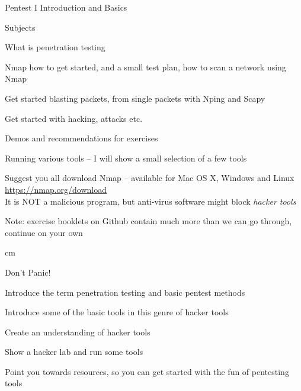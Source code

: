 \documentclass[Screen16to9,17pt]{foils}
\begin{document}
{}

\mytitlepage
{Pentest I Introduction and Basics}

\LogoOn



\begin{list1}
\item Subjects
\begin{list2}
\item What is penetration testing
\item Nmap how to get started, and a small test plan, how to scan a network using Nmap
\item Get started blasting packets, from single packets with Nping and Scapy
\item Get started with hacking, attacks etc.
\end{list2}
\item Demos and recommendations for exercises
\begin{list2}
\item Running various tools -- I will show a small selection of a few tools
\item Suggest you all download Nmap -- available for Mac OS X, Windows and Linux \url{https://nmap.org/download}\\
It is NOT a malicious program, but anti-virus software might block \emph{hacker tools}
\item Note: exercise booklets on Github contain much more than we can go through, continue on your own
\end{list2}
\end{list1}



 cm

\centerline{\color{titlecolor}\LARGE Don't Panic!}


\begin{list1}
\item Introduce the term penetration testing and basic pentest methods
\item Introduce some of the basic tools in this genre of hacker tools
\item Create an understanding of hacker tools
\item Show a hacker lab and run some tools
\item Point you towards resources, so you can get started with the fun of pentesting tools
\end{list1}
\end{document}
